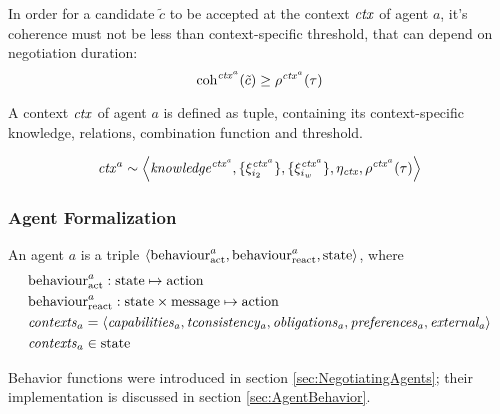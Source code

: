 \noindent
In order for a candidate $\tilde c$ to be accepted at the context $\mathit{ctx}$
of agent $a$, it's coherence must not be less than context-specific threshold,
that can depend on negotiation duration:
$$ \mathrm{coh}^{\mathit{ctx}^a}(\tilde c) \geq \rho^{\mathit{ctx}^a}(\tau) $$

\bigskip

\noindent
A context $\mathit{ctx}$ of agent $a$ is defined as tuple, containing its
context-specific knowledge, relations, combination function and threshold.

$$ \mathit{ctx}^a \sim \left< \mathit{knowledge^{\mathit{ctx}^a}},
                      \{\xi_{i_2}^{\mathit{ctx}^a}\},
                      \{\xi_{i_w}^{\mathit{ctx}^a}\},
                      \eta_{\mathit{ctx}},
                      \rho^{\mathit{ctx}^a}(\tau)
               \right> $$





\subsubsection{Agent Formalization}

\noindent
An agent $a$ is a triple $\left< \mathrm{behaviour}_{\mathrm{act}}^a,
                                 \mathrm{behaviour}_{\mathrm{react}}^a,
                                 \mathrm{state}
                          \right>$, where
\begin{align*}
  &\mathrm{behaviour}_{\mathrm{act}}^a   : \mathrm{state} \mapsto \mathrm{action} \\
  &\mathrm{behaviour}_{\mathrm{react}}^a : \mathrm{state} \times \mathrm{message} \mapsto \mathrm{action} \\
  &\mathit{contexts}_a = \left< \mathit{capabilities_a},
                                \mathit{tconsistency_a},
                                \mathit{obligations_a},
                                \mathit{preferences_a},
                                \mathit{external_a}
                           \right>\\
  &\mathit{contexts}_a \in \mathrm{state}
\end{align*}

Behavior functions were introduced in section \ref{sec:NegotiatingAgents};
their implementation is discussed in section \ref{sec:AgentBehavior}.





